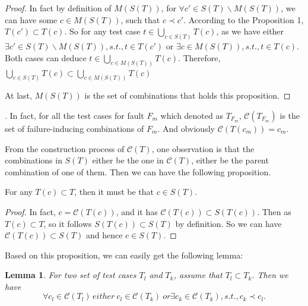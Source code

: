 \documentclass{sig-alternate}
\begin{document}
\begin{proof}
In fact by definition of $M(S(T))$, for $\forall c'\in S(T) \backslash M(S(T))$,  we can have some $c \in M(S(T))$, such that $c \prec c'$. According to the Proposition 1, $T(c') \subset T(c)$. So for any test case $t \in \bigcup_{c \in S(T)} T(c) $, as we have either $\exists c'\in S(T) \backslash M(S(T)), s.t., t \in T(c')$ or $\exists c \in M(S(T)), s.t., t \in T(c)$. Both cases can deduce $t \in \bigcup_{c \in M(S(T))} T(c)$. Therefore, $\bigcup_{c \in S(T)} T(c) \subset \bigcup_{c \in M(S(T))} T(c)$

At last, $M(S(T))$ is the set of combinations that holds this proposition.
\end{proof}.
In fact, for all the test cases for fault $F_{m}$ which denoted as $T_{F_{m}}$, $\mathcal{C}(T_{F_{m}})$ is the set of failure-inducing combinations of $F_{m}$. And obviously $\mathcal{C}(T(c_{m})) = c_{m}$.

From the construction process of $\mathcal{C}(T)$, one observation is that the combinations in $S(T)$ either be the one in $\mathcal{C}(T)$, either be the parent combination of one of them. Then we can have the following proposition.
\begin{proposition}
 For any $T(c) \subset T$, then it must be that $c \in S(T) $.
\end{proposition}
\begin{proof}
 In fact, $c = \mathcal{C}(T(c))$, and it has $ \mathcal{C}(T(c)) \subset S(T(c)) $. Then as $T(c) \subset T$, so it follows $S(T(c)) \subset S(T)$ by definition. So we can have $\mathcal{C}(T(c)) \subset S(T) $ and hence $c \in S(T)$.
\end{proof}




%

Based on this proposition, we can easily get the following lemma:
\newtheorem{lemma}{Lemma}
\begin{lemma}
For two set of test cases $T_{l}$ and $T_{k}$, assume that $T_{l} \subset T_{k}$. Then we have
 \begin{displaymath} \forall c_{l} \in \mathcal{C}(T_{l})\,  either\ c_{l} \in \mathcal{C}(T_{k})\ or \exists c_{k} \in \mathcal{C}(T_{k}), s.t., c_{k} \prec c_{l}.
 \end{displaymath}
\end{lemma}
\end{document}
